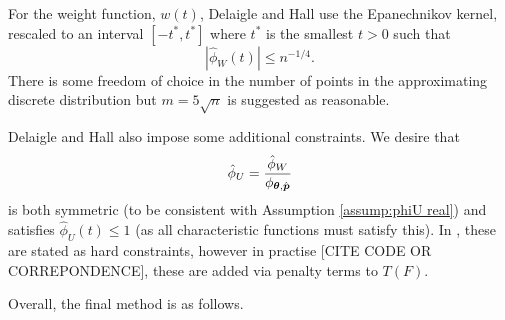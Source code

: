 	For the weight function, $w(t)$, Delaigle and Hall use the Epanechnikov kernel, rescaled to an interval $[-t^*, t^*]$ where $t^*$ is the smallest $t > 0$ such that 
	\begin{equation}
	\label{eq:define t star}
		\left|\hat{\phi}_W(t)\right| \leq n^{-1/4}.
	\end{equation}
	There is some freedom of choice in the number of points in the approximating discrete distribution but $m = 5\sqrt{n}$ is suggested as reasonable.

	Delaigle and Hall also impose some additional constraints. We desire that 
	\begin{equation}
		\hat{\phi}_U = \frac{\hat{\phi}_W}{\phi_{{\bm{{\theta}}}, \hat{{\bm{{p}}}}}}
	\end{equation}
	is both symmetric (to be consistent with Assumption \ref{assump:phiU real}) and satisfies $\hat{\phi}_U(t) \leq 1$ (as all characteristic functions must satisfy this). In \cite{Delaigle2016-la}, these are stated as hard constraints, however in practise [CITE CODE OR CORREPONDENCE], these are added via penalty terms to $T(F)$.

	Overall, the final method is as follows.

